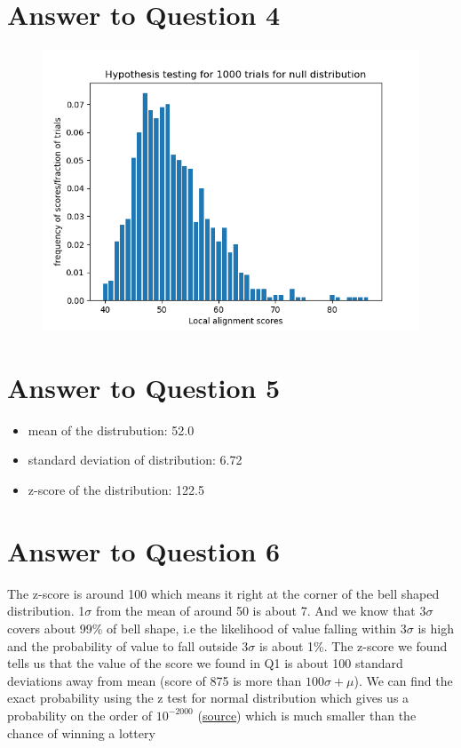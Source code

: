 \documentclass[a4paper]{article}
\begin{document}
\section*{Answer to Question 4}
\FloatBarrier
\begin{figure}[h]
\centering 
\includegraphics[scale = 1.0, clip=false, trim=0cm 0cm 0cm 0cm]{Q4_bar_graph.png}
\end{figure}
\FloatBarrier

\section*{Answer to Question 5}
\begin{itemize}
    \item mean of the distrubution:  52.0
    \item standard deviation of distribution:  6.72
    \item z-score of the distribution:  122.5
\end{itemize}

\section*{Answer to Question 6}
The z-score is around 100 which means it right at the corner of the bell
shaped distribution. 1$\sigma$ from the mean of around 50 is about 7. And
we know that 3$\sigma$ covers about 99\% of bell shape, i.e the 
likelihood of value falling within 3$\sigma$ is high and the probability of
value to fall outside 3$\sigma$ is  about 1\%. The z-score we found tells us that the value of the score we found in Q1 is about 100 standard deviations away from mean (score of 875 is more than $100\sigma + \mu$). We can find the exact probability using the z test for normal distribution which gives us a probability on the order of $10^{-2000}$ (\href{https://www.wolframalpha.com/input/?i=Probability+of+100+standard+deviations}{source}) which is much smaller than the chance of winning a lottery 
\end{document}
